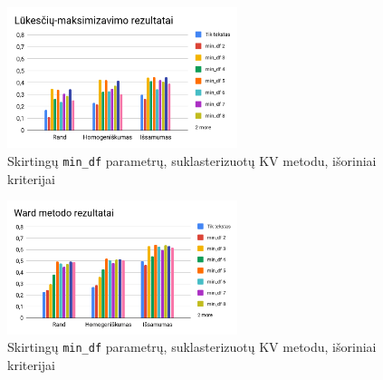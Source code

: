 \documentclass{VUMIFInfBakalaurinis}
\begin{document}
\begin{figure}[H]
	\centering
	\includegraphics[width=0.6\textwidth]{./img/image18.png}
  \caption{Skirtingų \texttt{min\_df} parametrų, suklasterizuotų KV metodu, išoriniai
  kriterijai}
\end{figure}

\begin{figure}[H]
	\centering
	\includegraphics[width=0.6\textwidth]{./img/image23.png}
  \caption{Skirtingų \texttt{min\_df} parametrų, suklasterizuotų KV metodu, išoriniai
  kriterijai}
\end{figure}
\end{document}
